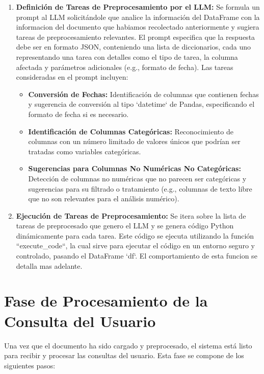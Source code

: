 \begin{enumerate}
	\item \textbf{Definición de Tareas de Preprocesamiento por el LLM:} Se formula un prompt al LLM solicitándole que analice la información del DataFrame con la informacion del documento que habiamos recolectado anteriormente y sugiera tareas de preprocesamiento relevantes.  El prompt especifica que la respuesta debe ser en formato JSON,  conteniendo una lista de diccionarios, cada uno representando una tarea con detalles como el tipo de tarea, la columna afectada y parámetros adicionales (e.g., formato de fecha).  Las tareas consideradas en el prompt incluyen:
	\begin{itemize}
		\item \textbf{Conversión de Fechas:}  Identificación de columnas que contienen fechas y sugerencia de conversión al tipo `datetime` de Pandas, especificando el formato de fecha si es necesario.
		\item \textbf{Identificación de Columnas Categóricas:}  Reconocimiento de columnas con un número limitado de valores únicos que podrían ser tratadas como variables categóricas.
		\item \textbf{Sugerencias para Columnas No Numéricas No Categóricas:}  Detección de columnas no numéricas que no parecen ser categóricas y sugerencias para su filtrado o tratamiento (e.g., columnas de texto libre que no son relevantes para el análisis numérico).
	\end{itemize}
	
	\item \textbf{Ejecución de Tareas de Preprocesamiento:}  Se itera sobre la lista de tareas de preprocesado que genero el LLM y se genera código Python dinámicamente para cada tarea.  Este código se ejecuta utilizando la función ``execute\_code``, la cual sirve para ejecutar el código en un entorno seguro y controlado, pasando el DataFrame `df`. El comportamiento de esta funcion se detalla mas adelante.
	\end{enumerate}

\section{Fase de Procesamiento de la Consulta del Usuario}

Una vez que el documento ha sido cargado y preprocesado, el sistema está listo para recibir y procesar las consultas del usuario. Esta fase se compone de los siguientes pasos:

